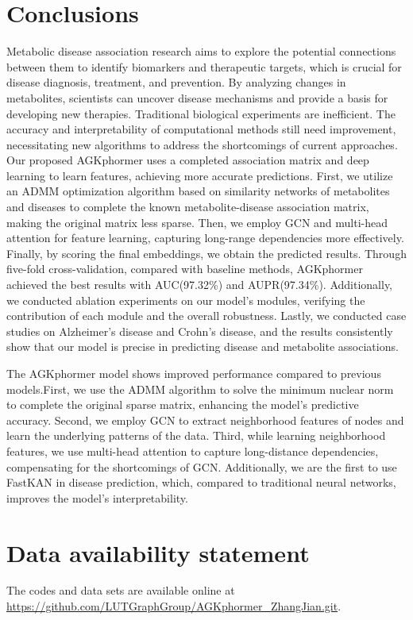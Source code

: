 \documentclass[a4paper,fleqn]{cas-dc}
\begin{document}
\section{Conclusions}\label{sec6}
Metabolic disease association research aims to explore the potential connections between them to identify biomarkers and therapeutic targets, which is crucial for disease diagnosis, treatment, and prevention. By analyzing changes in metabolites, scientists can uncover disease mechanisms and provide a basis for developing new therapies. Traditional biological experiments are inefficient. The accuracy and interpretability of computational methods still need improvement, necessitating new algorithms to address the shortcomings of current approaches. Our proposed AGKphormer uses a completed association matrix and deep learning to learn features, achieving more accurate predictions. First, we utilize an ADMM optimization algorithm based on similarity networks of metabolites and diseases to complete the known metabolite-disease association matrix, making the original matrix less sparse. Then, we employ GCN and multi-head attention for feature learning, capturing long-range dependencies more effectively. Finally, by scoring the final embeddings, we obtain the predicted results. Through five-fold cross-validation, compared with baseline methods, AGKphormer achieved the best results with AUC(97.32\%) and AUPR(97.34\%). Additionally, we conducted ablation experiments on our model's modules, verifying the contribution of each module and the overall robustness. Lastly, we conducted case studies on Alzheimer's disease and Crohn's disease, and the results consistently show that our model is precise in predicting disease and metabolite associations.

The AGKphormer model shows improved performance compared to previous models.First, we use the ADMM algorithm to solve the minimum nuclear norm to complete the original sparse matrix, enhancing the model's predictive accuracy. Second, we employ GCN to extract neighborhood features of nodes and learn the underlying patterns of the data. Third, while learning neighborhood features, we use multi-head attention to capture long-distance dependencies, compensating for the shortcomings of GCN. Additionally, we are the first to use FastKAN in disease prediction, which, compared to traditional neural networks, improves the model's interpretability.


\section*{Data availability statement}
The codes and data sets are available online at \url{https://github.com/LUTGraphGroup/AGKphormer_ZhangJian.git}.
\end{document}
